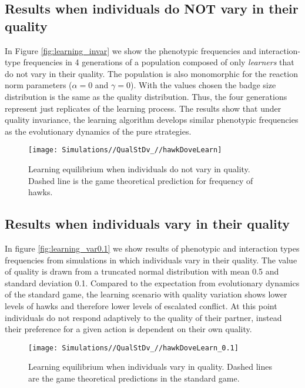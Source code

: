 \documentclass[]{article}
\begin{document}
\hypertarget{results-when-individuals-do-not-vary-in-their-quality}{%
\subsection{Results when individuals do NOT vary in their
quality}\label{results-when-individuals-do-not-vary-in-their-quality}}

In Figure \ref{fig:learning_invar} we show the phenotypic frequencies
and interaction-type frequencies in 4 generations of a population
composed of only \emph{learners} that do not vary in their quality. The
population is also monomorphic for the reaction norm parameters
(\(\alpha=0\) and \(\gamma=0\)). With the values chosen the badge size
distribution is the same as the quality distribution. Thus, the four
generations represent just replicates of the learning process. The
results show that under quality invariance, the learning algorithm
develops similar phenotypic frequencies as the evolutionary dynamics of
the pure strategies.

\begin{figure}
\texttt{[image: Simulations//QualStDv\_//hawkDoveLearn]} \caption{\label{fig:learning_invar}Learning equilibrium when individuals do not vary in quality. Dashed line is the  game theoretical prediction for frequency of hawks.}\label{fig:fig3}
\end{figure}

\hypertarget{results-when-individuals-vary-in-their-quality}{%
\subsection{Results when individuals vary in their
quality}\label{results-when-individuals-vary-in-their-quality}}

In figure \ref{fig:learning_var0.1} we show results of phenotypic and
interaction types frequencies from simulations in which individuals vary
in their quality. The value of quality is drawn from a truncated normal
distribution with mean 0.5 and standard deviation 0.1. Compared to the
expectation from evolutionary dynamics of the standard game, the
learning scenario with quality variation shows lower levels of hawks and
therefore lower levels of escalated conflict. At this point individuals
do not respond adaptively to the quality of their partner, instead their
preference for a given action is dependent on their own quality.

\begin{figure}
\texttt{[image: Simulations//QualStDv\_//hawkDoveLearn\_0.1]} \caption{\label{fig:learning_var0.1}Learning equilibrium when individuals vary in quality. Dashed lines are the  game theoretical predictions in the standard game.}\label{fig:fig4}
\end{figure}
\end{document}
